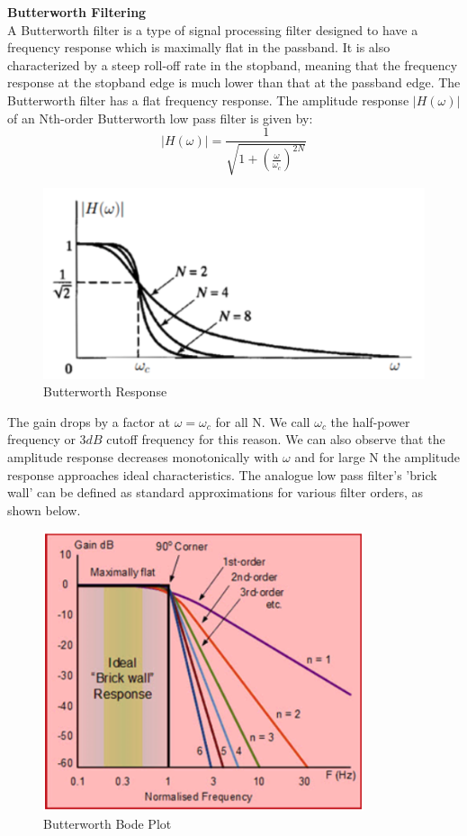 \documentclass[12pt,a4paper]{article}
\begin{document}
\newpage
			\textbf{Butterworth Filtering}\\
				A Butterworth filter is a type of signal processing filter designed to have a frequency response which is maximally flat in the passband. It is also characterized by a steep roll-off 
				rate in the stopband, meaning that the frequency response at the stopband edge is much lower than that at the passband edge.
						The Butterworth filter has a flat frequency response. The amplitude response $|H(\omega)|$ of an Nth-order Butterworth low pass filter is given by:
						$$
    						|H(\omega)| = \frac{1}{\sqrt{1 + (\frac{\omega}{\omega_c})^{2N}}}
						$$
			\begin{figure}[H]	
				\begin{center}
					\includegraphics[width=0.7\linewidth]{Butterworth_graph_2}
				\end{center}
				\caption{Butterworth Response}
			\end{figure}
					The gain drops by a factor  at $\omega = \omega_{c}$ for all N. We call $\omega_{c}$ the half-power frequency or $3dB$ cutoff frequency for this reason. We can also observe that the amplitude response decreases
				monotonically with $\omega$ and for large N the amplitude response approaches ideal characteristics\cite{AnalogueFilters}.
				The analogue low pass filter's 'brick wall' can be defined as standard approximations for various filter orders, as shown below\cite{SignalSuppression}.
			\begin{figure}[H]				
				\begin{center}
					\includegraphics[width=0.7\linewidth]{Butterworth_graph_1}
				\end{center}
				\caption{Butterworth Bode Plot}
			\end{figure}
\end{document}
